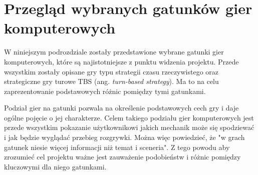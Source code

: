 \section{Przegląd wybranych gatunków gier komputerowych}
W niniejszym podrozdziale zostały przedstawione wybrane gatunki gier komputerowych, które są najistotniejsze z punktu widzenia
projektu. Przede wszystkim zostały opisane gry typu strategii czasu rzeczywistego oraz strategiczne gry turowe TBS (ang.
\textit{turn-based strategy}). Ma to na celu zaprezentowanie podstawowych różnic pomiędzy tymi gatunkami.

Podział gier na gatunki pozwala na określenie podstawowych cech gry i daje ogólne pojęcie o jej charakterze. Celem takiego
podziału gier komputerowych jest przede wszystkim pokazanie użytkownikowi jakich mechanik może się spodziewać i jak będzie
wyglądać przebieg rozgrywki. Można więc powiedzieć, że "w grach gatunek niesie więcej informacji niż temat i sceneria"\cite{practical_game_design}.
Z tego powodu aby zrozumieć cel projektu ważne jest zauważenie podobieństw i różnic pomiędzy kluczowymi dla niego gatunkami.





